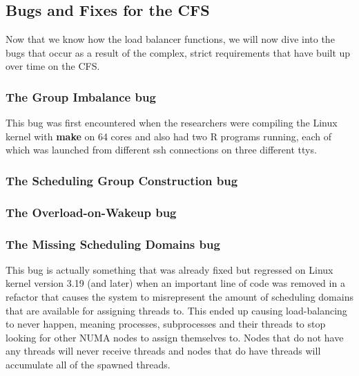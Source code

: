 \documentclass{sig-alternate}
\begin{document}

\subsection{Bugs and Fixes for the CFS}
\label{sec:cfsbugs}

Now that we know how the load balancer functions, we will now dive into the bugs that occur as a result of the complex, strict requirements that have built up over time on the CFS.

\subsubsection{The Group Imbalance bug}
\label{sec:cfsfault_grpimbalance}

This bug was first encountered when the researchers were compiling the Linux kernel with \textbf{make} on 64 cores and also had two R programs running, each of which was launched from different ssh connections on three different ttys. ~\cite{Lozi:2016}

\subsubsection{The Scheduling Group Construction bug}
\label{sec:cfsfault_grpconstruct}



\subsubsection{The Overload-on-Wakeup bug}
\label{sec:cfsfault_overload}

\subsubsection{The Missing Scheduling Domains bug}
\label{sec:cfsfault_missingsched}

This bug is actually something that was already fixed but regressed on Linux kernel version 3.19 (and later) when an important line of code was removed in a refactor that causes the system to misrepresent the amount of scheduling domains that are available for assigning threads to. This ended up causing load-balancing to never happen, meaning processes, subprocesses and their threads to stop looking for other NUMA nodes to assign themselves to. Nodes that do not have any threads will never receive threads and nodes that do have threads will accumulate all of the spawned threads.
\end{document}
